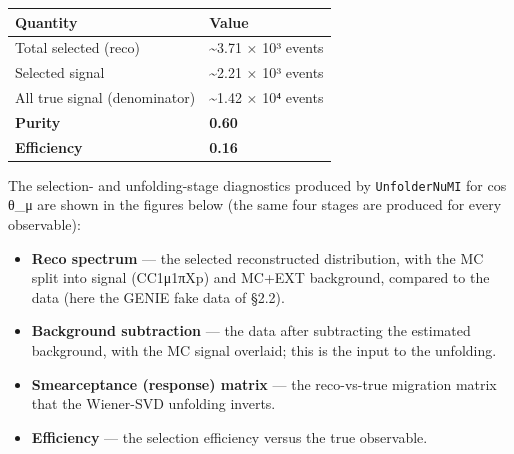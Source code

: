 \documentclass[11pt]{article}
\begin{document}
\begin{tabularx}{\textwidth}{|>{\raggedright\arraybackslash}X|>{\raggedright\arraybackslash}X|}
\hline
\textbf{Quantity} & \textbf{Value} \\
\hline
Total selected (reco) & \textasciitilde{}3.71 × 10³ events \\
Selected signal & \textasciitilde{}2.21 × 10³ events \\
All true signal (denominator) & \textasciitilde{}1.42 × 10⁴ events \\
\textbf{Purity} & \textbf{0.60} \\
\textbf{Efficiency} & \textbf{0.16} \\
\hline
\end{tabularx}

The selection- and unfolding-stage diagnostics produced by \texttt{UnfolderNuMI} for cos θ\_μ are shown in the figures below (the same four stages are produced for every observable):

\begin{itemize}
\item \textbf{Reco spectrum} — the selected reconstructed distribution, with the MC split into signal (CC1μ1πXp) and MC+EXT background, compared to the data (here the GENIE fake data of §2.2).
\item \textbf{Background subtraction} — the data after subtracting the estimated background, with the MC signal overlaid; this is the input to the unfolding.
\item \textbf{Smearceptance (response) matrix} — the reco-vs-true migration matrix that the Wiener-SVD unfolding inverts.
\item \textbf{Efficiency} — the selection efficiency versus the true observable.
\end{itemize}
\end{document}
